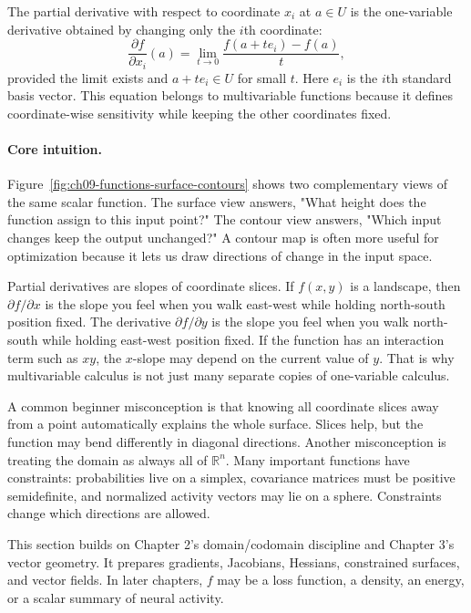 The partial derivative with respect to coordinate \(x_i\) at \(a\in U\) is the one-variable derivative obtained by changing only the \(i\)th coordinate:
\[
\frac{\partial f}{\partial x_i}(a)
=
\lim_{t\to 0}
\frac{f(a+t e_i)-f(a)}{t},
\]
provided the limit exists and \(a+t e_i\in U\) for small \(t\). Here \(e_i\) is the \(i\)th standard basis vector. This equation belongs to multivariable functions because it defines coordinate-wise sensitivity while keeping the other coordinates fixed.

\paragraph{Core intuition.}
Figure~\ref{fig:ch09-functions-surface-contours} shows two complementary views of the same scalar function. The surface view answers, "What height does the function assign to this input point?" The contour view answers, "Which input changes keep the output unchanged?" A contour map is often more useful for optimization because it lets us draw directions of change in the input space.

Partial derivatives are slopes of coordinate slices. If \(f(x,y)\) is a landscape, then \(\partial f/\partial x\) is the slope you feel when you walk east-west while holding north-south position fixed. The derivative \(\partial f/\partial y\) is the slope you feel when you walk north-south while holding east-west position fixed. If the function has an interaction term such as \(xy\), the \(x\)-slope may depend on the current value of \(y\). That is why multivariable calculus is not just many separate copies of one-variable calculus.

A common beginner misconception is that knowing all coordinate slices away from a point automatically explains the whole surface. Slices help, but the function may bend differently in diagonal directions. Another misconception is treating the domain as always all of \(\mathbb{R}^n\). Many important functions have constraints: probabilities live on a simplex, covariance matrices must be positive semidefinite, and normalized activity vectors may lie on a sphere. Constraints change which directions are allowed.

This section builds on Chapter 2's domain/codomain discipline and Chapter 3's vector geometry. It prepares gradients, Jacobians, Hessians, constrained surfaces, and vector fields. In later chapters, \(f\) may be a loss function, a density, an energy, or a scalar summary of neural activity.

